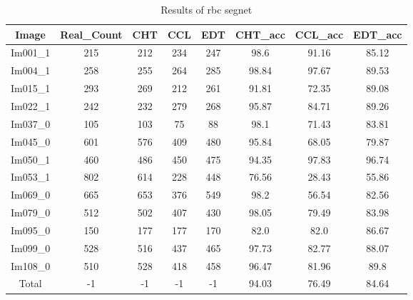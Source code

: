 \begin{table}[H]
\centering
\begin{tabular}{|c|c|c|c|c|c|c|c|}
\hline
 \textbf{Image} & \textbf{Real\_Count} & \textbf{CHT} & \textbf{CCL} & \textbf{EDT} & \textbf{CHT\_acc} & \textbf{CCL\_acc} & \textbf{EDT\_acc} \\ \hline
 Im001\_1 & 215 & 212 & 234 & 247 & 98.6 & 91.16 & 85.12 \\ 
 Im004\_1 & 258 & 255 & 264 & 285 & 98.84 & 97.67 & 89.53 \\ 
 Im015\_1 & 293 & 269 & 212 & 261 & 91.81 & 72.35 & 89.08 \\ 
 Im022\_1 & 242 & 232 & 279 & 268 & 95.87 & 84.71 & 89.26 \\ 
 Im037\_0 & 105 & 103 & 75 & 88 & 98.1 & 71.43 & 83.81 \\ 
 Im045\_0 & 601 & 576 & 409 & 480 & 95.84 & 68.05 & 79.87 \\ 
 Im050\_1 & 460 & 486 & 450 & 475 & 94.35 & 97.83 & 96.74 \\ 
 Im053\_1 & 802 & 614 & 228 & 448 & 76.56 & 28.43 & 55.86 \\ 
 Im069\_0 & 665 & 653 & 376 & 549 & 98.2 & 56.54 & 82.56 \\ 
 Im079\_0 & 512 & 502 & 407 & 430 & 98.05 & 79.49 & 83.98 \\ 
 Im095\_0 & 150 & 177 & 177 & 170 & 82.0 & 82.0 & 86.67 \\ 
 Im099\_0 & 528 & 516 & 437 & 465 & 97.73 & 82.77 & 88.07 \\ 
 Im108\_0 & 510 & 528 & 418 & 458 & 96.47 & 81.96 & 89.8 \\ \hline
 Total & -1 & -1 & -1 & -1 & 94.03 & 76.49 & 84.64 \\ 

\hline
\end{tabular}
\caption{Results of rbc segnet}
\label{Results of rbc segnet}
\end{table}
